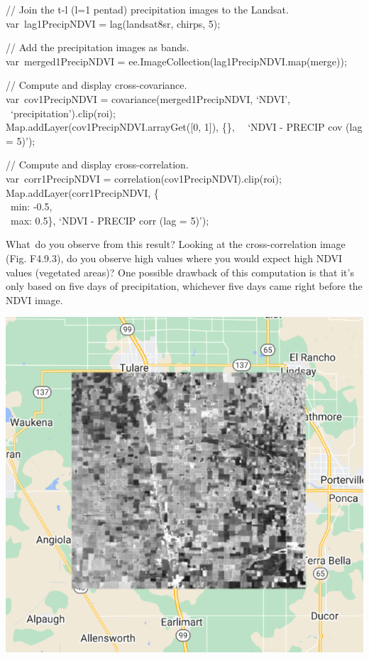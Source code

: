 \documentclass[
  letterpaper,
  DIV=11,
  numbers=noendperiod]{scrreprt}
\begin{document}
// Join the t-l (l=1 pentad) precipitation images to the Landsat.\\
var~lag1PrecipNDVI = lag(landsat8sr, chirps, 5);

// Add the precipitation images as bands.\\
var~merged1PrecipNDVI = ee.ImageCollection(lag1PrecipNDVI.map(merge));

// Compute and display cross-covariance.\\
var~cov1PrecipNDVI = covariance(merged1PrecipNDVI, `NDVI',~
~`precipitation').clip(roi);\\
Map.addLayer(cov1PrecipNDVI.arrayGet({[}0, 1{]}), \{\},~ ~`NDVI - PRECIP
cov (lag = 5)');

// Compute and display cross-correlation.\\
var~corr1PrecipNDVI = correlation(cov1PrecipNDVI).clip(roi);\\
Map.addLayer(corr1PrecipNDVI, \{\\
\hspace*{0.333em} ~min: -0.5,\\
\hspace*{0.333em} ~max: 0.5\}, `NDVI - PRECIP corr (lag = 5)');

What~do you observe from this result? Looking at the cross-correlation
image (Fig. F4.9.3), do you observe high values where you would expect
high NDVI values (vegetated areas)? One possible drawback of this
computation is that it's only based on five days of precipitation,
whichever five days came right before the NDVI image.

\includegraphics{./F4/image46.png}
\end{document}
